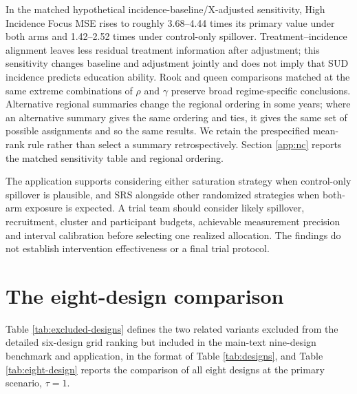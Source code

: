 \documentclass[11pt]{article}
\makeatletter
\newcommand{\applabel}[2]{\def\@currentlabel{#1}\label{#2}}
\makeatother
\begin{document}
In the matched hypothetical incidence-baseline/X-adjusted sensitivity,
High Incidence Focus MSE rises to roughly 3.68--4.44 times its primary
value under both arms and 1.42--2.52 times under control-only spillover.
Treatment--incidence alignment leaves less residual treatment
information after adjustment; this sensitivity changes baseline and
adjustment jointly and does not imply that SUD incidence predicts
education ability. Rook and queen comparisons matched at the same extreme combinations of $\rho$ and $\gamma$ preserve broad regime-specific conclusions. Alternative regional summaries change the regional ordering in some years; where an alternative summary gives the same ordering and ties, it gives the same set of possible assignments and so the same results. We retain the
prespecified mean-rank rule rather than select a summary
retrospectively. Section \ref{app:nc} reports the matched sensitivity
table and regional ordering.

The application supports considering either saturation strategy when
control-only spillover is plausible, and SRS alongside other randomized
strategies when both-arm exposure is expected. A trial team should
consider likely spillover, recruitment, cluster and participant budgets,
achievable measurement precision and interval calibration before
selecting one realized allocation. The findings do not establish
intervention effectiveness or a final trial protocol.

\section{The eight-design
comparison}\label{s1.-the-eight-design-comparison}

\applabel{S4}{app:eight-design}Table \ref{tab:excluded-designs} defines
the two related variants excluded from the detailed six-design grid
ranking but included in the main-text nine-design benchmark and
application, in the format of Table \ref{tab:designs}, and Table
\ref{tab:eight-design} reports the comparison of all eight designs at
the primary scenario, \(\tau = 1\).
\end{document}

